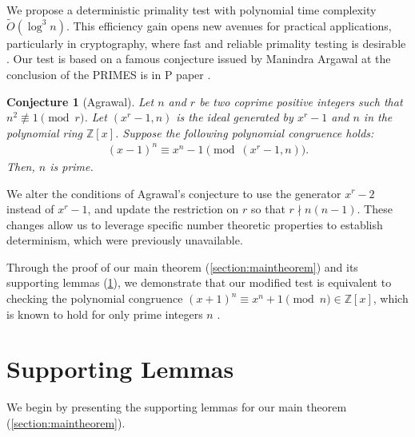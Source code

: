 \documentclass{article}
\theoremstyle{plain}
\newtheorem*{conjecture*}{Conjecture}
\theoremstyle{definition}
\newcommand{\Z}{\mathbb{Z}}
\begin{document}
We propose a deterministic primality test with polynomial time complexity $\tilde{O}(\log^3 n)$. This efficiency gain opens new avenues for practical applications, particularly in cryptography, where fast and reliable primality testing is desirable \cite{lenstra1987elliptic}. Our test is based on a famous conjecture issued by Manindra Argawal at the conclusion of the PRIMES is in P paper \cite{aks2002}.
\begin{conjecture*}[Agrawal]
Let $n$ and $r$ be two coprime positive integers such that $n^2 \not\equiv 1 \pmod{r}$. Let $(x^r-1,n)$ is the ideal generated by $x^r-1$ and $n$ in the polynomial ring $\Z[x]$. Suppose the following polynomial congruence holds:
\begin{align*}
    (x - 1)^n \equiv x^n - 1 \pmod{(x^r - 1,n)} .
\end{align*}
Then, $n$ is prime.
\end{conjecture*}
We alter the conditions of Agrawal's conjecture to use the generator $x^r-2$ instead of $x^r-1$, and update the restriction on $r$ so that $r \nmid n (n-1)$. These changes allow us to leverage specific number theoretic properties to establish determinism, which were previously unavailable.

Through the proof of our main theorem (\cref{section:maintheorem}) and its supporting lemmas (\cref{section:supportinglemmas}), we demonstrate that our modified test is equivalent to checking the polynomial congruence $(x+1)^n \equiv x^n+1 \pmod{n} \in \mathbb{Z}[x]$, which is known to hold for only prime integers $n$ \cite{granville2004primes}.

\section{Supporting Lemmas} \label{section:supportinglemmas}
We begin by presenting the supporting lemmas for our main theorem (\cref{section:maintheorem}).
\end{document}
